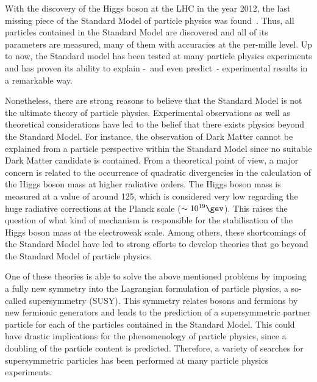 \noindent With the discovery of the Higgs boson at the LHC in the year 2012, the last missing piece of the Standard Model of particle physics was found~\cite{bib:Theory:CMS:HiggsObservation,bib:Theory:Atlas:HiggsObservation}.
Thus, all particles contained in the Standard Model are discovered and all of its parameters are measured, many of them with accuracies at the per-mille level.
Up to now,  the Standard model has been tested at many particle physics experiments and has proven its ability to explain -~and even predict~- experimental results in a remarkable way.


Nonetheless, there are strong reasons to believe that the Standard Model is not the ultimate theory of particle physics.
Experimental observations as well as theoretical considerations have led to the belief that there exists physics beyond the Standard Model.
For instance, the observation of Dark Matter cannot be explained from a particle perspective within the Standard Model since no suitable Dark Matter candidate is contained.
From a theoretical point of view, a major concern is related to the occurrence of quadratic divergencies in the calculation of the Higgs boson mass at higher radiative orders.
The Higgs boson mass is measured at a value of around 125\gev, which is considered very low regarding the huge radiative corrections at the Planck scale ($\sim 10^{19}\gev$). 
This raises the question of what kind of mechanism is responsible for the stabilisation of the Higgs boson mass at the electroweak scale. 
Among others, these shortcomings of the Standard Model have led to strong efforts to develop theories that go beyond the Standard Model of particle physics. 

One of these theories is able to solve the above mentioned problems by imposing a fully new symmetry into the Lagrangian formulation of particle physics, a so-called supersymmetry (SUSY).
This symmetry relates bosons and fermions by new fermionic generators and leads to the prediction of a supersymmetric partner particle for each of the particles contained in the Standard Model.
This could have drastic implications for the phenomenology of particle physics, since a doubling of the particle content is predicted.
Therefore, a variety of searches for supersymmetric particles has been performed at many particle physics experiments.\\

